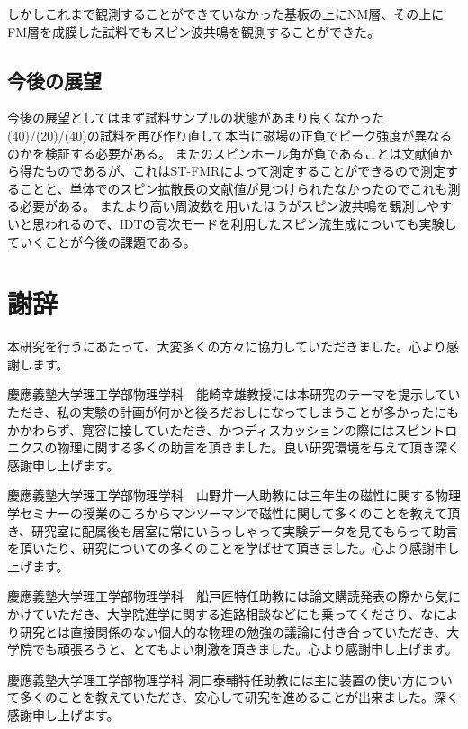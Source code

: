\documentclass[dvipdfmx,11pt]{jsreport}
\numberwithin{equation}{chapter}
\numberwithin{table}{chapter}
\begin{document}
しかしこれまで観測することができていなかった基板の上にNM層、その上にFM層を成膜した試料でもスピン波共鳴を観測することができた。
\section{今後の展望}
今後の展望としてはまず試料サンプルの状態があまり良くなかった(40)/(20)/(40)の試料を再び作り直して本当に磁場の正負でピーク強度が異なるのかを検証する必要がある。
またのスピンホール角が負であることは文献値から得たものであるが、これはST-FMRによって測定することができるので測定することと、単体でのスピン拡散長の文献値が見つけられたなかったのでこれも測る必要がある。
またより高い周波数を用いたほうがスピン波共鳴を観測しやすいと思われるので、IDTの高次モードを利用したスピン流生成についても実験していくことが今後の課題である。





\nocite{st,Peskin,spin_oxford,alma9926360528004034,alma990023076750204034,alma990023937250204034,ku,neko,shi,alma990008478350204034,hikansei}

\chapter*{謝辞}
本研究を行うにあたって、大変多くの方々に協力していただきました。心より感謝します。

慶應義塾大学理工学部物理学科　能崎幸雄教授には本研究のテーマを提示していただき、私の実験の計画が何かと後ろだおしになってしまうことが多かったにもかかわらず、寛容に接していただき、かつディスカッションの際にはスピントロニクスの物理に関する多くの助言を頂きました。良い研究環境を与えて頂き深く感謝申し上げます。

慶應義塾大学理工学部物理学科　山野井一人助教には三年生の磁性に関する物理学セミナーの授業のころからマンツーマンで磁性に関して多くのことを教えて頂き、研究室に配属後も居室に常にいらっしゃって実験データを見てもらって助言を頂いたり、研究についての多くのことを学ばせて頂きました。心より感謝申し上げます。

慶應義塾大学理工学部物理学科　船戸匠特任助教には論文購読発表の際から気にかけていただき、大学院進学に関する進路相談などにも乗ってくださり、なにより研究とは直接関係のない個人的な物理の勉強の議論に付き合っていただき、大学院でも頑張ろうと、とてもよい刺激を頂きました。心より感謝申し上げます。

慶應義塾大学理工学部物理学科 洞口泰輔特任助教には主に装置の使い方について多くのことを教えていただき、安心して研究を進めることが出来ました。深く感謝申し上げます。
\end{document}
